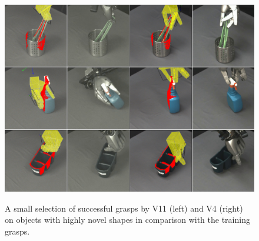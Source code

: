 \begin{figure}[t]
\begin{center}
\includegraphics[width=0.5\columnwidth]{images/A9A10_vertical}\\
\caption{A small selection of successful grasps by V11 (left) and V4 (right) on objects with highly novel shapes in comparison with the training grasps. \label{fig:interest}}
\end{center}
\end{figure}




